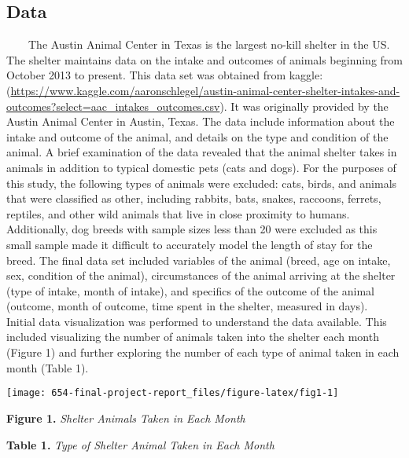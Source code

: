 \documentclass[
  11pt,
]{article}
\begin{document}
\hypertarget{data}{%
\subsection{Data}\label{data}}

~~~~The Austin Animal Center in Texas is the largest no-kill shelter in
the US. The shelter maintains data on the intake and outcomes of animals
beginning from October 2013 to present. This data set was obtained from
kaggle:
(\url{https://www.kaggle.com/aaronschlegel/austin-animal-center-shelter-intakes-and-outcomes?select=aac_intakes_outcomes.csv}).
It was originally provided by the Austin Animal Center in Austin, Texas.
The data include information about the intake and outcome of the animal,
and details on the type and condition of the animal. A brief examination
of the data revealed that the animal shelter takes in animals in
addition to typical domestic pets (cats and dogs). For the purposes of
this study, the following types of animals were excluded: cats, birds,
and animals that were classified as other, including rabbits, bats,
snakes, raccoons, ferrets, reptiles, and other wild animals that live in
close proximity to humans. Additionally, dog breeds with sample sizes
less than 20 were excluded as this small sample made it difficult to
accurately model the length of stay for the breed. The final data set
included variables of the animal (breed, age on intake, sex, condition
of the animal), circumstances of the animal arriving at the shelter
(type of intake, month of intake), and specifics of the outcome of the
animal (outcome, month of outcome, time spent in the shelter, measured
in days).\\
\hspace*{0.333em}\hspace*{0.333em}\hspace*{0.333em}\hspace*{0.333em}Initial
data visualization was performed to understand the data available. This
included visualizing the number of animals taken into the shelter each
month (Figure 1) and further exploring the number of each type of animal
taken in each month (Table 1).

\begin{center}\texttt{[image: 654-final-project-report\_files/figure-latex/fig1-1]} \end{center}

\textbf{Figure 1.} \emph{Shelter Animals Taken in Each Month}

\textbf{Table 1.} \emph{Type of Shelter Animal Taken in Each Month}
\end{document}
